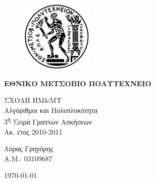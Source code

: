 \begin{titlepage}
\begin{center}
\begin{figure}[t] 
     \includegraphics[scale=0.7]{title/ntua_logo}
\end{figure}
\begin{LARGE}\textbf{ΕΘΝΙΚΟ ΜΕΤΣΟΒΙΟ ΠΟΛΥΤΕΧΝΕΙΟ\\}\end{LARGE}
\vspace{5cm}
\begin{Large}
ΣΧΟΛΗ ΗΜ\&ΜΥ\\
Αλγόριθμοι και Πολυπλοκότητα\\
3\textsuperscript{η} Σειρά Γραπτών Ασκήσεων\\
Ακ. έτος 2010-2011\\
\end{Large}
\vfill
\begin{flushright}
\Large{Λύρας Γρηγόρης}\\
\large{Α.Μ.: 03109687}\\
\end{flushright}
\large\today\\
\end{center}
\end{titlepage}

